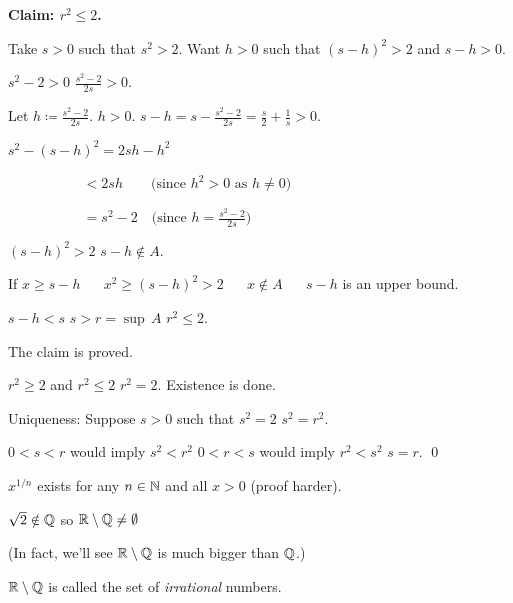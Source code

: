 \documentclass[10pt,aspectratio=169]{beamer}
\begin{document}
\begin{frame}
\textbf{Claim: $r^2 \leq 2$.}

\medskip
\pause

Take $s > 0$ such that $s^2 > 2$.
\pause
\quad
Want $h > 0$ such that ${(s-h)}^2 > 2$ and $s-h > 0$.

\medskip
\pause

$s^2-2 > 0$ \wthus $\frac{s^2-2}{2s} > 0$.

\medskip
\pause

Let $h \coloneqq \frac{s^2-2}{2s}$.
\qquad
\pause
$h > 0$.
\qquad
\pause
$s-h=s-\frac{s^2-2}{2s} = \frac{s}{2}+\frac{1}{s} > 0$.

\medskip
\pause

$\displaystyle
s^2 - {(s-h)}^2 = 2sh - h^2
$

\medskip
\pause

$\displaystyle
\,\, \quad \qquad \qquad
  < 2sh \qquad \bigl( \text{since } h^2 > 0 \text{ as } h \not= 0 \bigr)
$

\medskip
\pause

$\displaystyle
\,\, \quad \qquad \qquad
  = s^2-2 \quad \bigl( \text{since } h = \tfrac{s^2-2}{2s} \bigr)
$

\medskip
\pause

\thus \quad ${(s-h)}^2 > 2$
\pause
\wthus
$s-h \notin A$.

\medskip
\pause

If
$x \geq s-h$ ~\thus~ $x^2 \geq {(s-h)}^2 > 2$ %
\pause
~\thus~ $x \notin A$
\pause
~\thus~ $s-h$ is an upper bound.

\medskip
\pause

$s-h < s$ \wthus $s > r = \sup \, A$ \wthus $r^2 \leq 2$.

\medskip
\pause

The claim is proved.

\medskip
\pause

$r^2 \geq 2$ and $r^2 \leq 2$ \wthus $r^2 = 2$.
\pause
\quad Existence is done.

\medskip
\pause

Uniqueness: 
Suppose $s > 0$ such that $s^2=2$
\pause
\wthus
$s^2=r^2$.

\medskip
\pause

$0 < s < r$ would imply $s^2 < r^2$
\pause
\quad
$0 < r < s$ would imply $r^2 < s^2$
\pause
\wthus $s=r$.
\qed
\end{frame}

\begin{frame}
$x^{1/n}$ exists for any $n \in {\mathbb{N}}$ and all $x > 0$ (proof harder).

\medskip
\pause

$\sqrt{2} \notin {\mathbb{Q}}$
\qquad
\pause
so
${\mathbb{R}} \setminus {\mathbb{Q}} \not= \emptyset$

\pause
(In fact, we'll see ${\mathbb{R}} \setminus {\mathbb{Q}}$ is much bigger than ${\mathbb{Q}}$.)

\medskip
\pause

${\mathbb{R}} \setminus {\mathbb{Q}}$ is called the set of \emph{irrational} numbers.


\end{frame}
\end{document}
